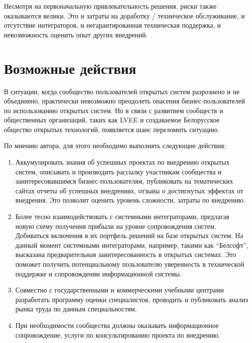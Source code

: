 \documentclass[10pt, a5paper]{article}
\begin{document}
Несмотря на первоначальную привлекательность решения, риски также оказываются велики. Это и затраты на доработку / техническое обслуживание, и отсутствие интеграторов, и негарантированная техническая поддержка, и невозможность оценить опыт других внедрений.

\section*{Возможные действия}

В ситуации, когда сообщество пользователей открытых систем разрознено и не объединено, практически невозможно преодолеть опасения бизнес-пользователей по использованию открытых систем.
Но в связи с развитием сообществ и общественных организаций, таких как LVEE и создаваемое Белорусское общество открытых технологий, появляется шанс переломить ситуацию.

По мнению автора, для этого необходимо выполнять следующие действия:

\begin{enumerate}
  \item Аккумулировать знания об успешных проектах по внедрению открытых систем, описывать и производить рассылку участникам сообщества и заинтересовавшимся бизнес-пользователям, публиковать на тематических сайтах отчеты об успешных внедрениях, отзывы о достигнутых эффектах от внедрения. Это позволит оценить уровень сложности, затраты по внедрению.
  \item Более тесно взаимодействовать с системными интеграторами, предлагая новую схему получения прибыли на уровне сопровождения систем. Добиваться включения в их портфель решений на базе открытых систем. На данный момент системными интеграторами, например, такими как ``Белсофт'', высказана предварительная заинтересованность в открытых системах. Это поможет получить потенциальному пользователю уверенность в технической поддержке и сопровождении информационной системы.
  \item Совместно с государственными и коммерческими учебными центрами разработать программу оценки специалистов, проводить и публиковать анализ рынка труда по данным специальностям.
  \item При необходимости сообщества должны оказывать информационное сопровождение, услуги по консультированию проекта по внедрению.
\end{enumerate}
\end{document}

